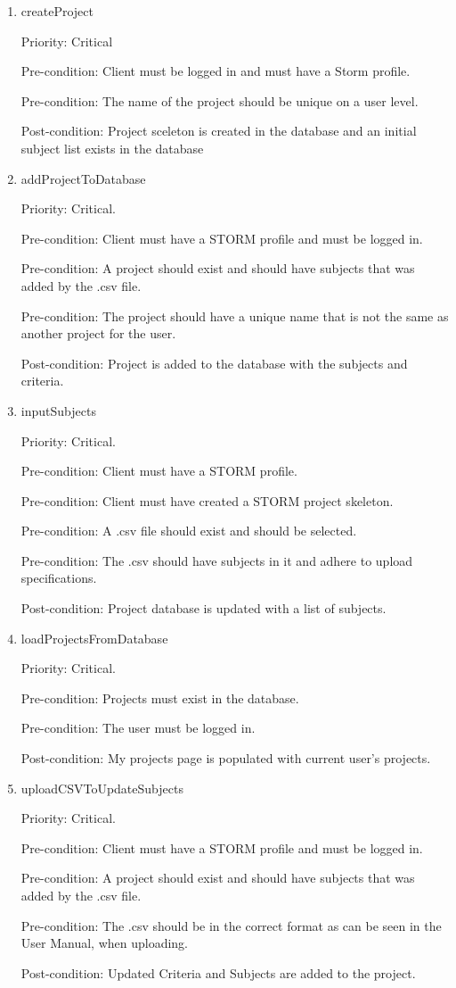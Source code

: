 \begin{enumerate}
\item createProject\par
Priority: Critical\par
Pre-condition: Client must be logged in and must have a Storm profile.\par
Pre-condition: The name of the project should be unique on a user level.\par
Post-condition: Project sceleton is created in the database and an initial subject list exists in the database\par
\item addProjectToDatabase\par
Priority: Critical.\par
Pre-condition: Client must have a STORM profile and must be logged in.\par
Pre-condition: A project should exist and should have subjects that was added by the .csv file.\par
Pre-condition: The project should have a unique name that is not the same as another project for the user.\par
Post-condition: Project is added to the database with the subjects and criteria.\par
\item inputSubjects\par
Priority: Critical.\par
Pre-condition: Client must have a STORM profile.\par
Pre-condition: Client must have created a STORM project skeleton.\par
Pre-condition: A .csv file should exist and should be selected.\par
Pre-condition: The .csv should have subjects in it and adhere to upload specifications.\par
Post-condition: Project database is updated with a list of subjects.\par
\item loadProjectsFromDatabase\par
Priority: Critical.\par
Pre-condition: Projects must exist in the database.\par
Pre-condition: The user must be logged in.\par
Post-condition: My projects page is populated with current user's projects.\par

\item uploadCSVToUpdateSubjects\par
Priority: Critical.\par
Pre-condition: Client must have a STORM profile and must be logged in.\par
Pre-condition: A project should exist and should have subjects that was added by the .csv file.\par
Pre-condition: The .csv should be in the correct format as can be seen in the User Manual, when uploading.\par
Post-condition: Updated Criteria and Subjects are added to the project.\par


\end{enumerate}
